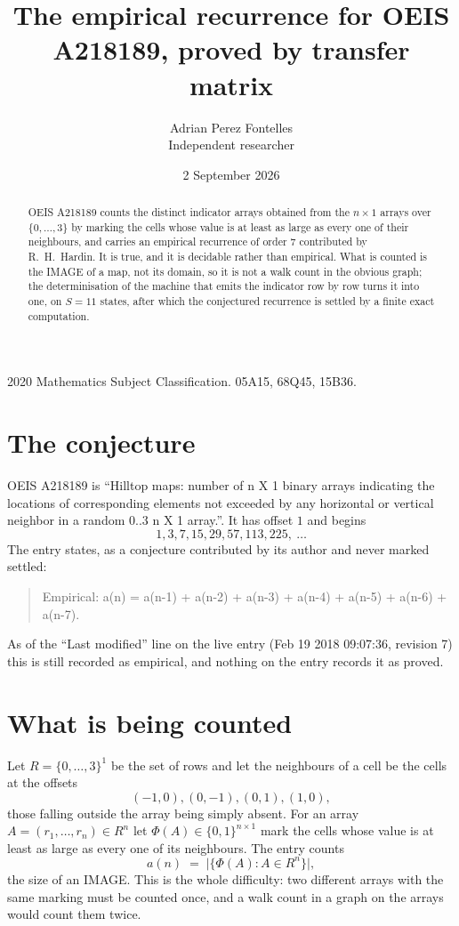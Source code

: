 \documentclass[11pt,a4paper]{article}
\title{The empirical recurrence for OEIS A218189, proved by transfer matrix}
\author{Adrian Perez Fontelles\\ \small Independent researcher}
\date{2 September 2026}
\theoremstyle{plain}
\theoremstyle{definition}
\begin{document}
\maketitle

\begin{abstract}
OEIS A218189 counts the distinct indicator arrays obtained from the $n\times1$ arrays over
$\{0,\dots,3\}$ by marking the cells whose value is at least as large as every one of their neighbours, and carries an
empirical recurrence of order $7$ contributed by R.~H.~Hardin. It is true, and it is
decidable rather than empirical. What is counted is the IMAGE of a map, not its domain, so it
is not a walk count in the obvious graph; the determinisation of the machine that emits the
indicator row by row turns it into one, on $S=11$ states, after which the conjectured
recurrence is settled by a finite exact computation.
\end{abstract}

\noindent\small 2020 Mathematics Subject Classification. 05A15, 68Q45, 15B36.\normalsize

\section{The conjecture}

OEIS A218189 is ``Hilltop maps: number of n X 1 binary arrays indicating the locations of corresponding elements not exceeded by any horizontal or vertical neighbor in a random 0..3 n X 1 array.''. It has offset $1$ and begins
\[
1, 3, 7, 15, 29, 57, 113, 225,\ \dots
\]
The entry states, as a conjecture contributed by its author and never marked settled:
\begin{quote}
Empirical: a(n) = a(n-1) + a(n-2) + a(n-3) + a(n-4) + a(n-5) + a(n-6) + a(n-7).
\end{quote}
As of the ``Last modified'' line on the live entry (Feb 19 2018 09:07:36, revision 7) this is still
recorded as empirical, and nothing on the entry records it as proved.

\section{What is being counted}

Let $R=\{0,\dots,3\}^{1}$ be the set of rows and let the neighbours of a cell be the
cells at the offsets
\[
(-1,0), (0,-1), (0,1), (1,0),
\]
those falling outside the array being simply absent. For an array
$A=(r_1,\dots,r_n)\in R^n$ let $\Phi(A)\in\{0,1\}^{n\times1}$ mark the cells whose value
is at least as large as every one of its neighbours. The entry counts
\[
a(n)\;=\;\bigl|\{\Phi(A):A\in R^n\}\bigr| ,
\]
the size of an IMAGE. This is the whole difficulty: two different arrays with the same marking
must be counted once, and a walk count in a graph on the arrays would count them twice.
\end{document}
